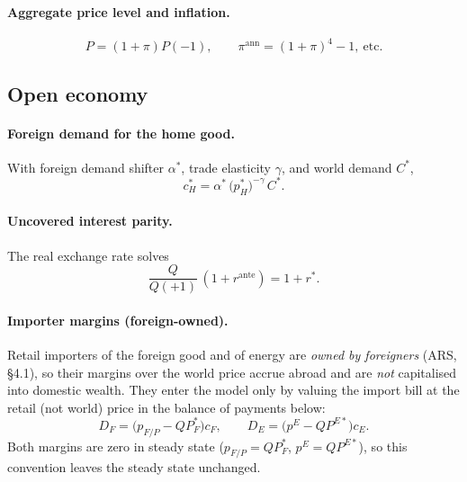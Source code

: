 \documentclass[11pt,a4paper]{article}
\newcommand{\pE}{p^{E}}
\begin{document}
\paragraph{Aggregate price level and inflation.}
\begin{equation}
P=(1+\pi)P(-1),\qquad
\pi^{\text{ann}}=(1+\pi)^4-1,\ \text{etc.}
\end{equation}

\subsection{Open economy}\label{sec:open}

\paragraph{Foreign demand for the home good.} With foreign demand shifter
$\alpha^{*}$, trade elasticity $\gamma$, and world demand $C^{*}$,
\begin{equation}
c_H^{*}=\alpha^{*}\,\bigl(p_H^{*}\bigr)^{-\gamma}\,C^{*}.
\end{equation}

\paragraph{Uncovered interest parity.} The real exchange rate solves
\begin{equation}
\frac{Q}{Q(+1)}\,(1+r^{\text{ante}})=1+r^{*}. \label{eq:uip}
\end{equation}

\paragraph{Importer margins (foreign-owned).} Retail importers of the foreign
good and of energy are \emph{owned by foreigners} (ARS, \S4.1), so their margins
over the world price accrue abroad and are \emph{not} capitalised into domestic
wealth. They enter the model only by valuing the import bill at the retail (not
world) price in the balance of payments below:
\begin{equation}
D_F = \bigl(p_{F/P}-Q P^{*}_{F}\bigr)c_F,\qquad
D_E = \bigl(\pE-Q P^{E*}\bigr)c_E .
\end{equation}
Both margins are zero in steady state ($p_{F/P}=Q P^{*}_{F}$, $\pE=Q P^{E*}$), so
this convention leaves the steady state unchanged.
\end{document}
